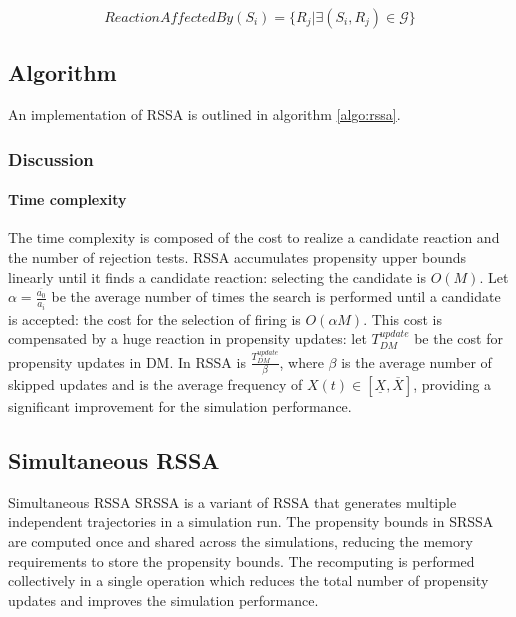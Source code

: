     $$ReactionAffectedBy(S_i) = \{R_j|\exists(S_i,R_j)\in\mathcal{G}\}$$

  \subsection{Algorithm}
  An implementation of RSSA is outlined in algorithm \ref{algo:rssa}.

  

    \subsubsection{Discussion}

      \paragraph{Time complexity}
      The time complexity is composed of the cost to realize a candidate reaction and the number of rejection tests.
      RSSA accumulates propensity upper bounds linearly until it finds a candidate reaction: selecting the candidate is $O(M)$.
      Let $\alpha = \frac{\overline{a_0}}{a_i}$ be the average number of times the search is performed until a candidate is accepted: the cost for the selection of firing is $O(\alpha M)$.
      This cost is compensated by a huge reaction in propensity updates: let $T_{DM}^{update}$ be the cost for propensity updates in DM.
      In RSSA is $\frac{T_{DM}^{update}}{\beta}$, where $\beta$ is the average number of skipped updates and is the average frequency of $X(t)\in[\underline{X},\overline{X}]$, providing a significant improvement for the simulation performance.

  \subsection{Simultaneous RSSA}
  Simultaneous RSSA SRSSA is a variant of RSSA that generates multiple independent trajectories in a simulation run.
  The propensity bounds in SRSSA are computed once and shared across the simulations, reducing the memory requirements to store the propensity bounds.
  The recomputing is performed collectively in a single operation which reduces the total number of propensity updates and improves the simulation performance.

